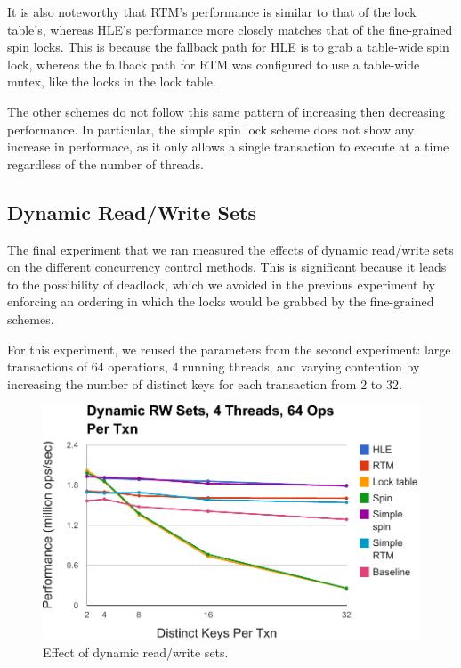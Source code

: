 It is also noteworthy that RTM's performance is similar to that of the lock
table's, whereas HLE's performance more closely matches that of the fine-grained
spin locks.  This is because the fallback path for HLE is to grab a table-wide
spin lock, whereas the fallback path for RTM was configured to use a table-wide
mutex, like the locks in the lock table.

The other schemes do not follow this same pattern of increasing then decreasing
performance. In particular, the simple spin lock scheme does not show any
increase in performace, as it only allows a single transaction to execute at a
time regardless of the number of threads.

\subsection{Dynamic Read/Write Sets}

The final experiment that we ran measured the effects of dynamic read/write sets
on the different concurrency control methods. This is significant because it
leads to the possibility of deadlock, which we avoided in the previous
experiment by enforcing an ordering in which the locks would be grabbed by the
fine-grained schemes.

For this experiment, we reused the parameters from the second experiment:
large transactions of 64 operations, 4 running threads, and varying 
contention by increasing the number of distinct keys for each transaction 
from 2 to 32.

\begin{figure}[h!]
  \centering
  \includegraphics[scale=0.575]{figure/dynamic.pdf}
  \caption{Effect of dynamic read/write sets.}
  \label{fig:dynamic} 
\end{figure}

